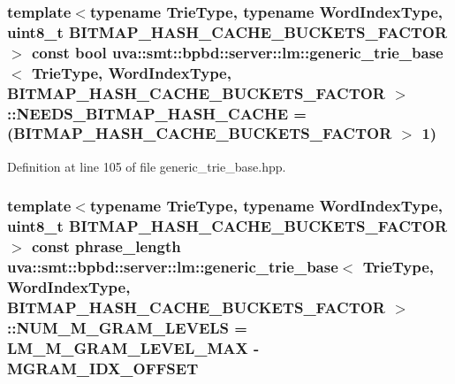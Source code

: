 \subsubsection[{N\+E\+E\+D\+S\+\_\+\+B\+I\+T\+M\+A\+P\+\_\+\+H\+A\+S\+H\+\_\+\+C\+A\+C\+H\+E}]{\setlength{\rightskip}{0pt plus 5cm}template$<$typename Trie\+Type, typename Word\+Index\+Type, uint8\+\_\+t B\+I\+T\+M\+A\+P\+\_\+\+H\+A\+S\+H\+\_\+\+C\+A\+C\+H\+E\+\_\+\+B\+U\+C\+K\+E\+T\+S\+\_\+\+F\+A\+C\+T\+O\+R$>$ const bool {\bf uva\+::smt\+::bpbd\+::server\+::lm\+::generic\+\_\+trie\+\_\+base}$<$ Trie\+Type, {\bf Word\+Index\+Type}, B\+I\+T\+M\+A\+P\+\_\+\+H\+A\+S\+H\+\_\+\+C\+A\+C\+H\+E\+\_\+\+B\+U\+C\+K\+E\+T\+S\+\_\+\+F\+A\+C\+T\+O\+R $>$\+::N\+E\+E\+D\+S\+\_\+\+B\+I\+T\+M\+A\+P\+\_\+\+H\+A\+S\+H\+\_\+\+C\+A\+C\+H\+E = (B\+I\+T\+M\+A\+P\+\_\+\+H\+A\+S\+H\+\_\+\+C\+A\+C\+H\+E\+\_\+\+B\+U\+C\+K\+E\+T\+S\+\_\+\+F\+A\+C\+T\+O\+R $>$ 1)\hspace{0.3cm}{\ttfamily [static]}}\label{classuva_1_1smt_1_1bpbd_1_1server_1_1lm_1_1generic__trie__base_a75a5cd884a3ea7088aa85f418ee04689}


Definition at line 105 of file generic\+\_\+trie\+\_\+base.\+hpp.

\hypertarget{classuva_1_1smt_1_1bpbd_1_1server_1_1lm_1_1generic__trie__base_ae417bb22c7bfd06f05395bcba71ae0f1}{}
\subsubsection[{N\+U\+M\+\_\+\+M\+\_\+\+G\+R\+A\+M\+\_\+\+L\+E\+V\+E\+L\+S}]{\setlength{\rightskip}{0pt plus 5cm}template$<$typename Trie\+Type, typename Word\+Index\+Type, uint8\+\_\+t B\+I\+T\+M\+A\+P\+\_\+\+H\+A\+S\+H\+\_\+\+C\+A\+C\+H\+E\+\_\+\+B\+U\+C\+K\+E\+T\+S\+\_\+\+F\+A\+C\+T\+O\+R$>$ const {\bf phrase\+\_\+length} {\bf uva\+::smt\+::bpbd\+::server\+::lm\+::generic\+\_\+trie\+\_\+base}$<$ Trie\+Type, {\bf Word\+Index\+Type}, B\+I\+T\+M\+A\+P\+\_\+\+H\+A\+S\+H\+\_\+\+C\+A\+C\+H\+E\+\_\+\+B\+U\+C\+K\+E\+T\+S\+\_\+\+F\+A\+C\+T\+O\+R $>$\+::N\+U\+M\+\_\+\+M\+\_\+\+G\+R\+A\+M\+\_\+\+L\+E\+V\+E\+L\+S = L\+M\+\_\+\+M\+\_\+\+G\+R\+A\+M\+\_\+\+L\+E\+V\+E\+L\+\_\+\+M\+A\+X -\/ {\bf M\+G\+R\+A\+M\+\_\+\+I\+D\+X\+\_\+\+O\+F\+F\+S\+E\+T}\hspace{0.3cm}{\ttfamily [static]}}\label{classuva_1_1smt_1_1bpbd_1_1server_1_1lm_1_1generic__trie__base_ae417bb22c7bfd06f05395bcba71ae0f1}



